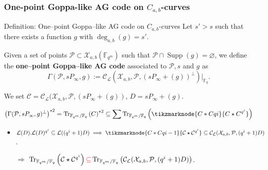 \documentclass[
10pt, %
%
aspectratio=169, %
]{beamer}
\theoremstyle{plain}%
\theoremstyle{definition}
\theoremstyle{remark}
\newcommand{\calP}{\mathcal{P}}
\newcommand{\calL}{\mathcal{L}}
\newcommand{\calC}{\mathcal{C}}
\newcommand{\calX}{\mathcal{X}}
\newcommand{\fq}{\mathbb{F}_{q}}
\newcommand{\F}{\mathbb{F}}
\newcommand{\Tr}[1]{\operatorname{Tr}_{\mathbb{F}_{q^m}/\fq}\left(#1\right)}
\newcommand{\Supp}{\operatorname{Supp}}
\newcommand{\GRS}{\operatorname{\mathsf{GRS}}}
\newcommand{\degab}[1]{\deg_{a,b}\left(#1\right)}
\newcommand\highlightnode[2]{ %
	\node (#1-frame)[rounded corners,fit=(#1),inner sep=2pt,fill=#2,fill opacity=0.17] {};
}
\begin{document}
\begin{frame}
\frametitle{One-point Goppa-like AG code on $C_{a,b}$-curves}
\begin{block}{Definition: One--point Goppa--like AG code on $C_{a,b}$-curves}
	Let $s'>s$ such that there exists a function $g$ with $\degab{g}=s'$.
	
	Given a set of points  $\calP \subset \calX_{a,b}(\F_{q^m})$ such that $\calP \cap \Supp(g) = \varnothing$, we define the \textbf{one--point Goppa--like AG code} associated to $\calP,s$ and $g$ as 
	\[\Gamma(\calP,sP_\infty,g) := \calC_{\calL}(\calX_{a,b},\calP,(sP_\infty+(g))^{\perp})|_{\fq}.\]
\end{block}
	We set $\calC = \calC_{\calL}(\calX_{a,b},\calP,(sP_\infty+(g))$, $D = sP_\infty+(g)$.

\[\left(\Gamma(\calP,sP_\infty,g)^\perp\right)^{\star 2} = \Tr{C}^{\star 2} \subseteq \sum \Tr{\tikzmarknode{C*Cqi}{C \star C^{q^i}}} \]

	
\begin{itemize}
	\item $\calL(D).\calL(D)^{q^i}\subseteq \calL((q^i +1)D) \implies \tikzmarknode{C*Cqi-1}{\calC\star\calC^{q^i}} \subseteq \calC_{\calL}(\calX_{a,b},\calP,(q^i +1)D)$.
	\item[$\Rightarrow$] $\Tr{\calC\star\calC^{q^i}} \textcolor{red}{\subseteq} \Tr{\calC_{\calL}(\calX_{a,b},\calP,(q^i +1)D)}$.
\end{itemize}




\end{frame}
\end{document}
